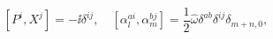 \begin{equation}\label{quant-b}
  [P^i,X^j]=-\ii\delta^{ij},\quad [\alpha^{ai}_l,\alpha^{bj}_m]=
  \frac{1}{2}\hat{\omega}\delta^{ab}\delta^{ij}\delta_{m+n,0},
\end{equation}

